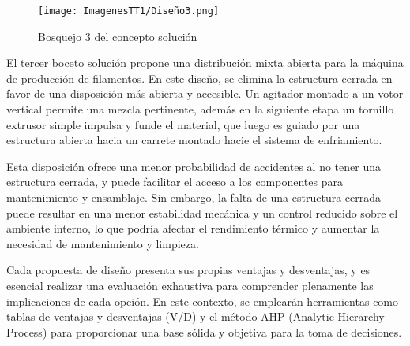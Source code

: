 \documentclass[14pt,oneside]{extarticle} %
\begin{document}
\begin{figure}[H]
    \centering
    \texttt{[image: ImagenesTT1/Diseño3.png]}
    \caption{Bosquejo 3 del concepto solución}
    \label{fig:Diseño3}
\end{figure}

El tercer boceto solución propone una distribución mixta abierta para la máquina de producción de filamentos. En este diseño, se elimina la estructura cerrada en favor de una disposición más abierta y accesible. Un agitador montado a un votor vertical permite una mezcla pertinente, además en la siguiente etapa un tornillo extrusor simple impulsa y funde el material, que luego es guiado por una estructura abierta hacia un carrete montado hacie el sistema de enfriamiento. 

Esta disposición ofrece una menor probabilidad de accidentes al no tener una estructura cerrada, y puede facilitar el acceso a los componentes para mantenimiento y ensamblaje. Sin embargo, la falta de una estructura cerrada puede resultar en una menor estabilidad mecánica y un control reducido sobre el ambiente interno, lo que podría afectar el rendimiento térmico y aumentar la necesidad de mantenimiento y limpieza.

\newpage

Cada propuesta de diseño presenta sus propias ventajas y desventajas, y es esencial realizar una evaluación exhaustiva para comprender plenamente las implicaciones de cada opción. En este contexto, se emplearán herramientas como tablas de ventajas y desventajas (V/D) y el método AHP (Analytic Hierarchy Process) para proporcionar una base sólida y objetiva para la toma de decisiones.
\end{document}
